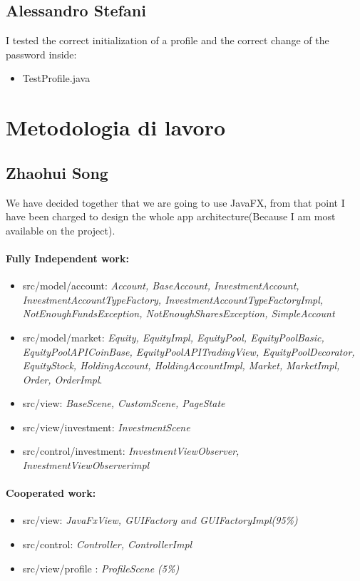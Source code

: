 \documentclass[a4paper,12pt]{report}
\begin{document}
\subsection{Alessandro Stefani}
I tested the correct initialization of a profile and the correct change of the password inside:
\begin{itemize}
    \item TestProfile.java
\end{itemize}

\section{Metodologia di lavoro}
\subsection{Zhaohui Song}
We have decided together that we are going to use JavaFX, from that point I have been charged to design the whole app architecture(Because I am most available on the project).
\paragraph*{Fully Independent work:}
\begin{itemize}
    \item src/model/account: \textit{Account, BaseAccount, InvestmentAccount, 
    InvestmentAccountTypeFactory, InvestmentAccountTypeFactoryImpl, NotEnoughFundsException, NotEnoughSharesException, SimpleAccount}
    \item src/model/market: \textit{Equity, EquityImpl, EquityPool, EquityPoolBasic, 
    EquityPoolAPICoinBase, EquityPoolAPITradingView, EquityPoolDecorator, 
    EquityStock, HoldingAccount, HoldingAccountImpl, Market, MarketImpl, Order, OrderImpl}.
    \item src/view: \textit{BaseScene, CustomScene, PageState}
    \item src/view/investment: \textit{InvestmentScene}
    \item src/control/investment: \textit{InvestmentViewObserver, InvestmentViewObserverimpl}
\end{itemize}

\paragraph*{Cooperated work:}
\begin{itemize}
     \item src/view: \textit{JavaFxView, GUIFactory and GUIFactoryImpl(95\%)}
     \item src/control: \textit{Controller, ControllerImpl}
     \item src/view/profile : \textit{ProfileScene (5\%)}
\end{itemize}
\end{document}
